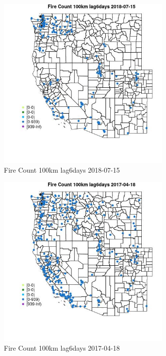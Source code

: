\begin{figure} 
\centering  
\includegraphics[width=0.77\textwidth]{Code_Outputs/Report_ML_input_PM25_Step4_part_e_de_duplicated_aves_compiled_2019-05-20wNAs_MapObsFire_Count_100km_lag6days2018-07-15.jpg} 
\caption{\label{fig:Report_ML_input_PM25_Step4_part_e_de_duplicated_aves_compiled_2019-05-20wNAsMapObsFire_Count_100km_lag6days2018-07-15}Fire Count 100km lag6days 2018-07-15} 
\end{figure} 
 

\begin{figure} 
\centering  
\includegraphics[width=0.77\textwidth]{Code_Outputs/Report_ML_input_PM25_Step4_part_e_de_duplicated_aves_compiled_2019-05-20wNAs_MapObsFire_Count_100km_lag6days2017-04-18.jpg} 
\caption{\label{fig:Report_ML_input_PM25_Step4_part_e_de_duplicated_aves_compiled_2019-05-20wNAsMapObsFire_Count_100km_lag6days2017-04-18}Fire Count 100km lag6days 2017-04-18} 
\end{figure} 
 

